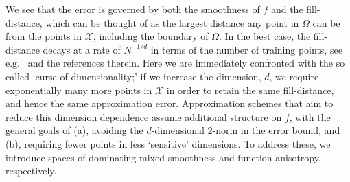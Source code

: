 \documentclass[pdflatex,sn-mathphys-num]{sn-jnl}%
\theoremstyle{thmstyleone}%
\theoremstyle{thmstyletwo}%
\theoremstyle{thmstylethree}%
\begin{document}
We see that the error is governed by both the smoothness of $f$ and the fill-distance, which can be thought of as the largest distance any point in $\Omega$ can be from the points in \(\mathcal{X}\), including the boundary of \(\Omega\). In the best case, the fill-distance decays at a rate of \(N^{-1/d}\) in terms of the number of training points, see e.g.~\cite{Teckentrup2020} and the references therein. Here we are immediately confronted with the so called `curse of dimensionality;' if we increase the dimension, \(d\), we require exponentially many more points in \(\mathcal{X}\) in order to retain the same fill-distance, and hence the same approximation error. Approximation schemes that aim to reduce this dimension dependence assume additional structure on \(f\), with the general goals of (a), avoiding the \(d\)-dimensional 2-norm in the error bound, and (b), requiring fewer points in less `sensitive' dimensions. To address these, we introduce spaces of dominating mixed smoothness and function anisotropy, respectively.
\end{document}
